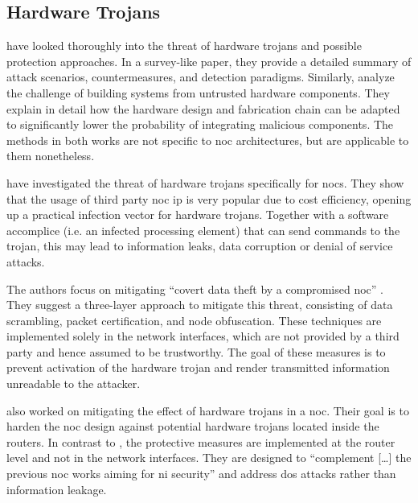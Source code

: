 \subsection{Hardware Trojans}
\citeauthor{bhunia14hardwaretrojans} \cite{bhunia14hardwaretrojans} have looked thoroughly into the threat of hardware trojans and possible protection
approaches. In a survey-like paper, they provide a detailed summary of attack scenarios, countermeasures, and detection paradigms. Similarly,
\citeauthor{sethumadhavan15trustworthyhardware} \cite{sethumadhavan15trustworthyhardware} analyze the challenge of building systems from untrusted
hardware components. They explain in detail how the hardware design and fabrication chain can be adapted to significantly lower the probability of
integrating malicious components. The methods in both works are not specific to \gls{noc} architectures, but are applicable to them nonetheless.

\citeauthor{ancajas14fortnocs} \cite{ancajas14fortnocs} have investigated the threat of hardware trojans specifically for \glspl{noc}. They show that the usage of
third party \gls{noc} \gls{ip} is very popular due to cost efficiency, opening up a practical infection vector for hardware
trojans. Together with a software accomplice (i.e. an infected processing element) that can send commands to the trojan, this may
lead to information leaks, data corruption or denial of service attacks.

The authors focus on mitigating \enquote{covert data theft by a compromised \gls{noc}} \cite[3]{ancajas14fortnocs}. They suggest a three-layer
approach to mitigate this threat, consisting of data scrambling, packet certification, and node obfuscation. These techniques are
implemented solely in the network interfaces, which are not provided by a third party and hence assumed to be trustworthy. The goal of these measures
is to prevent activation of the hardware trojan and render transmitted information unreadable to the attacker.

\citeauthor{frey17hardenednoc} \cite{frey17hardenednoc} also worked on mitigating the effect of hardware trojans in a \gls{noc}. Their goal is to
harden the \gls{noc} design against potential hardware trojans located inside the routers. In contrast to \citeauthor{ancajas14fortnocs}
\cite{ancajas14fortnocs}, the protective measures are implemented at the router level and not in the network interfaces. They are designed to
\enquote{complement […] the previous \gls{noc} works aiming for \gls{ni} security} \cite[16]{frey17hardenednoc} and address \gls{dos} attacks rather
than information leakage.

